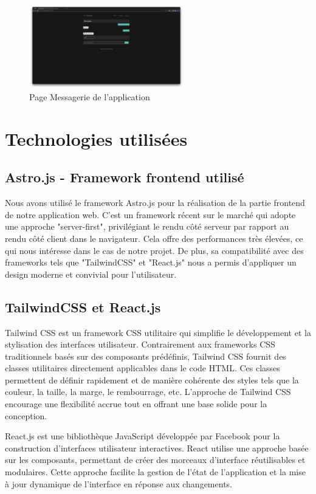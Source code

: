 \documentclass[12pt, a4paper, oneside]{Thesis}
\begin{document}
\begin{figure}[h]
    \centering
    \includegraphics[width=0.6\textwidth]{images/PageMessagerieApplication.png}
    \caption{Page Messagerie de l'application}
\end{figure}

\section{Technologies utilisées}
\subsection{Astro.js - Framework frontend utilisé}
Nous avons utilisé le framework Astro.js pour la réalisation de la partie frontend de notre application web. C'est un framework récent sur le marché qui adopte une approche "server-first", privilégiant le rendu côté serveur par rapport au rendu côté client dans le navigateur. Cela offre des performances très élevées, ce qui nous intéresse dans le cas de notre projet. De plus, sa compatibilité avec des frameworks tels que "TailwindCSS" et "React.js" nous a permis d'appliquer un design moderne et convivial pour l'utilisateur.

\subsection{TailwindCSS et React.js}
Tailwind CSS est un framework CSS utilitaire qui simplifie le développement et la stylisation des interfaces utilisateur. Contrairement aux frameworks CSS traditionnels basés sur des composants prédéfinis, Tailwind CSS fournit des classes utilitaires directement applicables dans le code HTML. Ces classes permettent de définir rapidement et de manière cohérente des styles tels que la couleur, la taille, la marge, le rembourrage, etc. L'approche de Tailwind CSS encourage une flexibilité accrue tout en offrant une base solide pour la conception.

React.js est une bibliothèque JavaScript développée par Facebook pour la construction d'interfaces utilisateur interactives. React utilise une approche basée sur les composants, permettant de créer des morceaux d'interface réutilisables et modulaires. Cette approche facilite la gestion de l'état de l'application et la mise à jour dynamique de l'interface en réponse aux changements.
\end{document}
